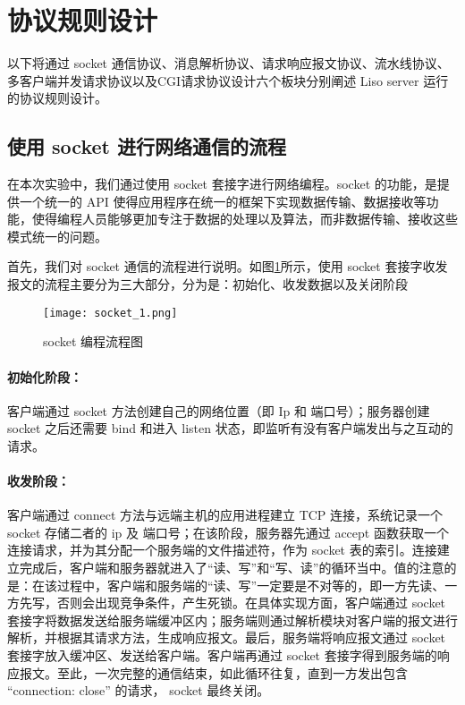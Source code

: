 \section{协议规则设计}

以下将通过 socket 通信协议、消息解析协议、请求响应报文协议、流水线协议、多客户端并发请求协议以及CGI请求协议设计六个板块分别阐述 Liso server 运行的协议规则设计。

\subsection{使用 socket 进行网络通信的流程}

在本次实验中，我们通过使用 socket 套接字进行网络编程。socket 的功能，是提供一个统一的 API 使得应用程序在统一的框架下实现数据传输、数据接收等功能，使得编程人员能够更加专注于数据的处理以及算法，而非数据传输、接收这些模式统一的问题。

首先，我们对 socket 通信的流程进行说明。如图\ref{fig:socket1}所示，使用 socket 套接字收发报文的流程主要分为三大部分，分为是：初始化、收发数据以及关闭阶段

\begin{figure}
  \centering
  \texttt{[image: socket\_1.png]}
  \caption{socket 编程流程图}\label{fig:socket1}
\end{figure}

\paragraph*{初始化阶段：} 客户端通过 socket 方法创建自己的网络位置（即 Ip 和 端口号）；服务器创建 socket 之后还需要 bind 和进入 listen 状态，即监听有没有客户端发出与之互动的请求。

\paragraph*{收发阶段：} 客户端通过 connect 方法与远端主机的应用进程建立 TCP 连接，系统记录一个 socket 存储二者的 ip 及 端口号；在该阶段，服务器先通过 accept 函数获取一个连接请求，并为其分配一个服务端的文件描述符，作为 socket 表的索引。连接建立完成后，客户端和服务器就进入了“读、写”和“写、读”的循环当中。值的注意的是：在该过程中，客户端和服务端的“读、写”一定要是不对等的，即一方先读、一方先写，否则会出现竞争条件，产生死锁。在具体实现方面，客户端通过 socket 套接字将数据发送给服务端缓冲区内；服务端则通过解析模块对客户端的报文进行解析，并根据其请求方法，生成响应报文。最后，服务端将响应报文通过 socket 套接字放入缓冲区、发送给客户端。客户端再通过 socket 套接字得到服务端的响应报文。至此，一次完整的通信结束，如此循环往复，直到一方发出包含 “connection: close” 的请求， socket 最终关闭。

